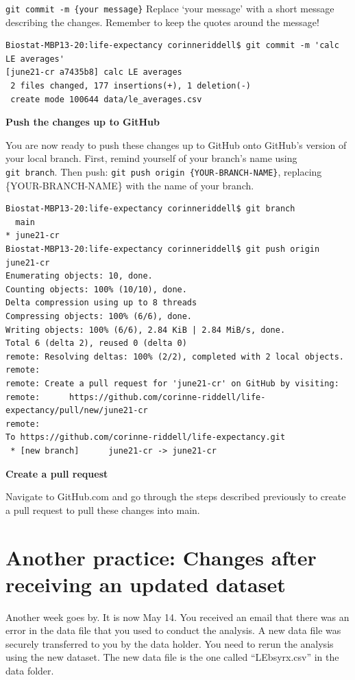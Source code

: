 \documentclass[
]{book}
\begin{document}
\texttt{git\ commit\ -m\ \textquotesingle{}\{your\ message\}\textquotesingle{}}
Replace `your message' with a short message describing the changes. Remember to keep the quotes around the message!

\begin{verbatim}
Biostat-MBP13-20:life-expectancy corinneriddell$ git commit -m 'calc LE averages' 
[june21-cr a7435b8] calc LE averages
 2 files changed, 177 insertions(+), 1 deletion(-)
 create mode 100644 data/le_averages.csv
\end{verbatim}

\textbf{Push the changes up to GitHub}

You are now ready to push these changes up to GitHub onto GitHub's version
of your local branch. First, remind yourself of your branch's name using
\texttt{git\ branch}. Then push: \texttt{git\ push\ origin\ \{YOUR-BRANCH-NAME\}}, replacing
\{YOUR-BRANCH-NAME\} with the name of your branch.

\begin{verbatim}
Biostat-MBP13-20:life-expectancy corinneriddell$ git branch
  main
* june21-cr
Biostat-MBP13-20:life-expectancy corinneriddell$ git push origin june21-cr
Enumerating objects: 10, done.
Counting objects: 100% (10/10), done.
Delta compression using up to 8 threads
Compressing objects: 100% (6/6), done.
Writing objects: 100% (6/6), 2.84 KiB | 2.84 MiB/s, done.
Total 6 (delta 2), reused 0 (delta 0)
remote: Resolving deltas: 100% (2/2), completed with 2 local objects.
remote: 
remote: Create a pull request for 'june21-cr' on GitHub by visiting:
remote:      https://github.com/corinne-riddell/life-expectancy/pull/new/june21-cr
remote: 
To https://github.com/corinne-riddell/life-expectancy.git
 * [new branch]      june21-cr -> june21-cr
\end{verbatim}

\textbf{Create a pull request}

Navigate to GitHub.com and go through the steps described previously to
create a pull request to pull these changes into main.

\section{Another practice: Changes after receiving an updated dataset}\label{another-practice-changes-after-receiving-an-updated-dataset}

Another week goes by. It is now May 14. You received an email that there was an
error in the data file that you used to conduct the analysis. A new data file
was securely transferred to you by the data holder. You need to rerun the analysis
using the new dataset. The new data file is the one called ``LEbsyrx.csv'' in the
data folder.
\end{document}
